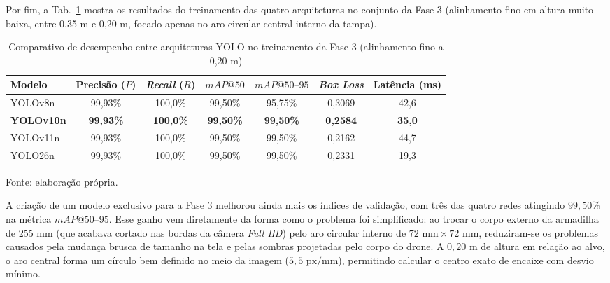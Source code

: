 Por fim, a Tab.~\ref{tab:comparativo_yolo_etapa3_alinhamento} mostra os resultados do treinamento das quatro arquiteturas no conjunto da Fase 3 (alinhamento fino em altura muito baixa, entre 0,35 m e 0,20 m, focado apenas no aro circular central interno da tampa).

\begin{table}[H]
	\centering
	\footnotesize
	\setlength{\tabcolsep}{3.5pt}
	\captionsetup{justification=centering}
	\caption{Comparativo de desempenho entre arquiteturas YOLO no treinamento da Fase 3 (alinhamento fino a 0,20 m)}
	\label{tab:comparativo_yolo_etapa3_alinhamento}
	\vspace{0.2cm}
	\begin{tabular}{lcccccc}
		\hline
		\textbf{Modelo} & \textbf{Precisão ($P$)} & \textbf{\textit{Recall} ($R$)} & \textbf{$mAP@50$} & \textbf{$mAP@50\text{--}95$} & \textbf{\textit{Box Loss}} & \textbf{Latência (ms)} \\
		\hline
		YOLOv8n   & 99,93\%    & 100,0\%    & 99,50\%    & 95,75\%         & 0,3069             & 42,6 \\
		\textbf{YOLOv10n}  & \textbf{99,93\%} & \textbf{100,0\%} & \textbf{99,50\%} & \textbf{99,50\%} & \textbf{0,2584} & \textbf{35,0} \\
		YOLOv11n  & 99,93\%    & 100,0\%    & 99,50\%    & 99,50\%         & 0,2162             & 44,7 \\
		YOLO26n   & 99,93\%    & 100,0\%    & 99,50\%    & 99,50\%         & 0,2331             & 19,3 \\
		\hline
	\end{tabular}
	\vspace{0.2cm}
	\begin{flushleft}
		\footnotesize Fonte: elaboração própria.
	\end{flushleft}
\end{table}

A criação de um modelo exclusivo para a Fase 3 melhorou ainda mais os índices de validação, com três das quatro redes atingindo $99{,}50\%$ na métrica $mAP@50\text{--}95$. Esse ganho vem diretamente da forma como o problema foi simplificado: ao trocar o corpo externo da armadilha de 255 mm (que acabava cortado nas bordas da câmera \textit{Full HD}) pelo aro circular interno de $72\text{ mm} \times 72\text{ mm}$, reduziram-se os problemas causados pela mudança brusca de tamanho na tela e pelas sombras projetadas pelo corpo do drone. A $0{,}20\text{ m}$ de altura em relação ao alvo, o aro central forma um círculo bem definido no meio da imagem ($5{,}5\text{ px/mm}$), permitindo calcular o centro exato de encaixe com desvio mínimo.

